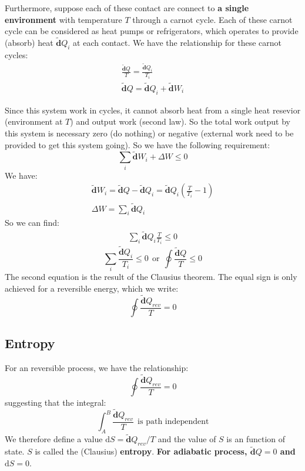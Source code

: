 \documentclass{article}
\newcommand{\dbar}{\mathbf{\tilde{d}}}
\newcommand{\dnor}{\text{d}}
\begin{document}
Furthermore, suppose each of these contact are connect to \textbf{a single environment} 
with temperature $T$ through a carnot cycle. Each of these carnot cycle can be considered
as heat pumps or refrigerators, which operates to provide (absorb) heat $\dbar Q_i $
at each contact.
We have the relationship for these carnot cycles:
\begin{gather}
    \frac{\dbar Q}{T} = \frac{\dbar Q_i}{T_i} \\
    \dbar Q = \dbar Q_i + \dbar W_i 
\end{gather}

Since this system work in cycles, it cannot absorb heat from a single heat resevior (environment at $T$) 
and output work (second law). So the total work output by this system is necessary zero (do nothing) or negative 
(external work need to be provided to get this system going). So we have the following requirement:
\begin{equation}
    \sum_i \dbar W_i + \Delta W \le 0
\end{equation}
We have:
\begin{gather}
    \dbar W_i = \dbar Q - \dbar Q_i = \dbar Q_i (\frac{T}{T_i} - 1) \\
    \Delta W = \sum_i \dbar Q_i 
\end{gather}
So we can find:
\begin{gather}
    \sum_i \dbar Q_i \frac{T}{T_i} \le 0 
\end{gather}
\[
\boxed{\sum_i \frac{\dbar Q_i}{T_i} \le 0 \ \ \text{or}\ \  \oint \frac{\dbar Q}{T} \le 0}
\]
The second equation is the result of the Clausius theorem. The equal sign is only achieved for a reversible energy,
which we write:
\[
   \boxed{ \oint \frac{\dbar Q_{rev}}{T} = 0 }
\]

\subsection{Entropy}
For an reversible process, we have the relationship:
\begin{equation}
    \oint \frac{\dbar Q_{rev}}{T} = 0
\end{equation}
suggesting that the integral:
\begin{equation}
    \int_{A}^{B} \frac{\dbar Q_{rev}}{T} \ \ \text{is path independent}
\end{equation}
We therefore define a value $\dnor S = \dbar Q_{rev} / T$ and the value 
of $S$ is an function of state. $S$ is called the (Clausius) \textbf{entropy}. 
\textbf{For adiabatic process, $\dbar Q = 0$ and $\dnor S = 0$}.
\end{document}
